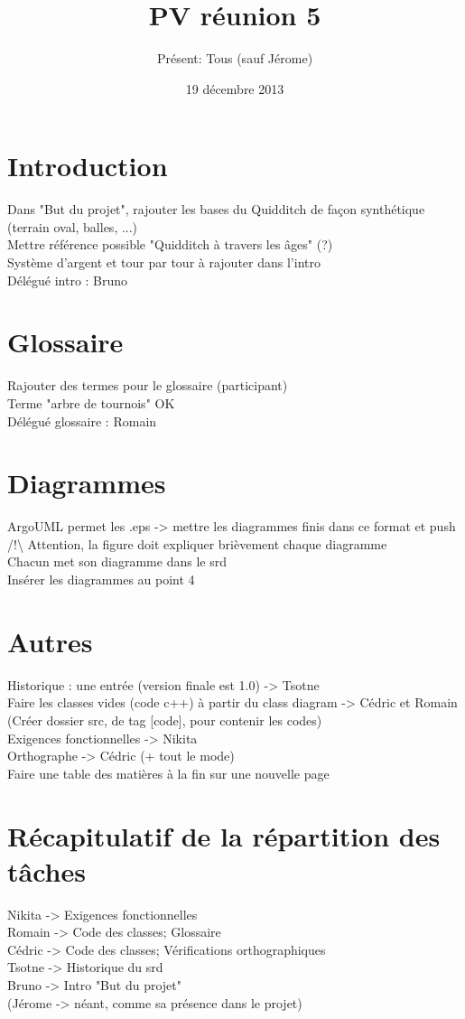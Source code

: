 \documentclass[a4paper,10pt]{article}
\author{Présent: Tous (sauf Jérome)}
\title{PV réunion 5}
\date{19 décembre 2013}
\begin{document}
\maketitle
\part*{Introduction}
Dans "But du projet", rajouter les bases du Quidditch de façon synthétique (terrain oval, balles, ...)\\
Mettre référence possible "Quidditch à travers les âges" (?)\\
Système d'argent et tour par tour à rajouter dans l'intro\\
Délégué intro : Bruno
\part*{Glossaire}
Rajouter des termes pour le glossaire (participant)\\
Terme "arbre de tournois" OK\\
Délégué glossaire : Romain
\part*{Diagrammes}
ArgoUML permet les .eps -> mettre les diagrammes finis dans ce format et push\\
/!\textbackslash{} Attention, la figure doit expliquer brièvement chaque diagramme\\
Chacun met son diagramme dans le srd\\
Insérer les diagrammes au point 4
\part*{Autres}
Historique : une entrée (version finale est 1.0) -> Tsotne\\
Faire les classes vides (code c++) à partir du class diagram -> Cédric et Romain\\
(Créer dossier src, de tag [code], pour contenir les codes)\\
Exigences fonctionnelles -> Nikita\\
Orthographe -> Cédric (+ tout le mode)\\
Faire une table des matières à la fin sur une nouvelle page
\part*{Récapitulatif de la répartition des tâches}
Nikita -> Exigences fonctionnelles\\
Romain -> Code des classes; Glossaire\\
Cédric -> Code des classes; Vérifications orthographiques\\
Tsotne -> Historique du srd\\
Bruno -> Intro "But du projet"\\
(Jérome -> néant, comme sa présence dans le projet)
\end{document}
